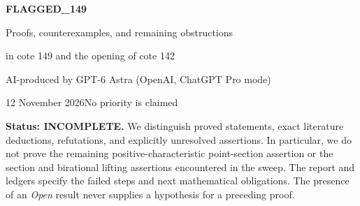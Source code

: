 \documentclass[11pt,a4paper]{article}
\newcounter{result}
\begin{document}
\thispagestyle{empty}
\begin{center}
{\Large\bfseries FLAGGED\_149}\par\medskip
{\large Proofs, counterexamples, and remaining obstructions\par
in cote 149 and the opening of cote 142}\par\medskip
{\small AI-produced by GPT-6 Astra (OpenAI, ChatGPT Pro mode)}\par
{\small 12 November 2026\quad No priority is claimed}
\end{center}
\noindent\textbf{Status: INCOMPLETE.}
We distinguish proved statements, exact literature deductions, refutations,
and explicitly unresolved assertions. In particular, we do not prove the
remaining positive-characteristic point-section assertion or the section
and birational lifting assertions encountered in the sweep. The report
and ledgers specify the failed steps and next mathematical obligations.
The presence of an \emph{Open} result never supplies a hypothesis for a
preceding proof.
\end{document}
